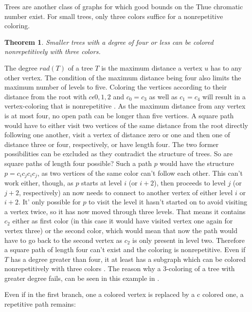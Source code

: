\documentclass[12pt,a4paper]{article}
\newtheorem{theorem}{Theorem}
\begin{document}
Trees are another class of graphs for which good bounds on the Thue chromatic number exist. For small trees, only three colors suffice for a nonrepetitive coloring.
\begin{theorem}
Smaller trees with a degree of four or less can be colored nonrepetitively with three colors.
\end{theorem} 
The degree $rad(T)$ of a tree $T$ is the maximum distance a vertex $u$ has to any other vertex. The condition of the maximum distance being four also limits the maximum number of levels to five. Coloring the vertices according to their distance from the root with $c \epsilon {0, 1, 2}$ and $c_0 = c_3$ as well as $c_1 = c_4$ will result in a vertex-coloring that is nonrepetitive \citep{Bresar2007}. As the maximum distance from any vertex is at most four, no open path can be longer than five vertices. A square path would have to either visit two vertices of the same distance from the root directly following one another, visit a vertex of distance zero or one and then one of distance three or four, respectively, or have length four. The two former possibilities can be excluded as they contradict the structure of trees. So are square paths of length four possible? Such a path $p$ would have the structure $p=c_ic_jc_ic_j$, as two vertices of the same color can't follow each other. This can't work either, though, as $p$ starts at level $i$ (or $i+2$), then proceeds to level $j$ (or $j+2$, respectively) an now needs to connect to another vertex of either level $i$ or $i+2$. It' only possible for $p$ to visit the level it hasn't started on to avoid visiting a vertex twice, so it has now moved through three levels. That means it contains $c_2$ either as first color (in this case it would have visited vertex one again for vertex three) or the second color, which would mean that now the path would have to go back to the second vertex as $c_2$ is only present in level two. Therefore a square path of length four can't exist and the coloring is nonrepetitive.
\newline
Even if $T$ has a degree greater than four, it at least has a subgraph which can be colored nonrepetitively with three colors \citep{Bresar2007}. The reason why a 3-coloring of a tree with greater degree fails, can be seen in this example in \citep{Bresar2007}.
\begin{figure}

\end{figure} 
Even if in the first branch, one a colored vertex is replaced by a c colored one, a repetitive path remains:
\end{document}
